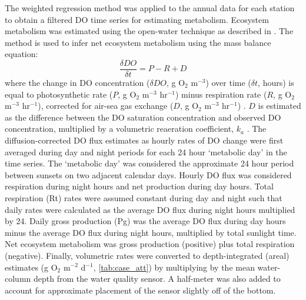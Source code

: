 \documentclass[letterpaper,12pt,oneside]{article}\usepackage[]{graphicx}\usepackage[]{color}
\begin{document}
The weighted regression method was applied to the annual data for each station to obtain a filtered \ac{DO} time series for estimating metabolism.  Ecosystem metabolism was estimated using the open-water technique \citep{Odum56} as described in \citet{Caffrey14}.  The method is used to infer net ecosystem metabolism using the mass balance equation:
\begin{equation} \label{metrate}
\frac{\delta DO}{\delta t} = P - R + D
\end{equation}
where the change in \ac{DO} concentration ($\delta DO$, g O$_2$ m$^{-3}$) over time ($\delta t$, hours) is equal to photosynthetic rate ($P$, g O$_2$ m$^{-3}$ hr$^{-1}$) minus respiration rate ($R$, g O$_2$ m$^{-3}$ hr$^{-1}$), corrected for air-sea gas exchange ($D$, g O$_2$ m$^{-3}$ hr$^{-1}$) \citep{Caffrey14}. $D$ is estimated as the difference between the \ac{DO} saturation concentration and observed \ac{DO} concentration, multiplied by a volumetric reaeration coefficient, $k_a$ \citep{Thebault08}.  The diffusion-corrected \ac{DO} flux estimates as hourly rates of \ac{DO} change were first averaged during day and night periods for each 24 hour `metabolic day' in the time series. The `metabolic day' was considered the approximate 24 hour period between sunsets on two adjacent calendar days.  Hourly \ac{DO} flux was considered respiration during night hours and net production during day hours.  Total respiration (Rt) rates were assumed constant during day and night such that daily rates were calculated as the average \ac{DO} flux during night hours multiplied by 24. Daily gross production (Pg) was the average \ac{DO} flux during day hours minus the average \ac{DO} flux during night hours, multiplied by total sunlight time.  Net ecosystem metabolism was gross production (positive) plus total respiration (negative).  Finally, volumetric rates were converted to depth-integrated (areal) estimates (g O$_2$ m$^{-2}$ d$^{-1}$, \cref{tab:case_att}) by multiplying by the mean water-column depth from the water quality sensor.  A half-meter was also added to account for approximate placement of the sensor slightly off of the bottom.  
\end{document}
